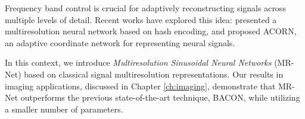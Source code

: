 
Frequency band control is crucial for adaptively reconstructing signals across multiple levels of detail. Recent works have explored this idea: \citet{mueller2022instant} presented a multiresolution neural network based on hash encoding, and \citet{martel2021acorn} proposed ACORN, an adaptive coordinate network for representing neural signals. 

In this context, we introduce \textit{Multiresolution Sinusoidal Neural Networks} (MR-Net) \citep{paz2022,paz2023mr} based on classical signal multiresolution representations. Our results in imaging applications, discussed in Chapter \ref{ch:imaging}, demonstrate that MR-Net outperforms the previous state-of-the-art technique, BACON, while utilizing a smaller number of parameters.










